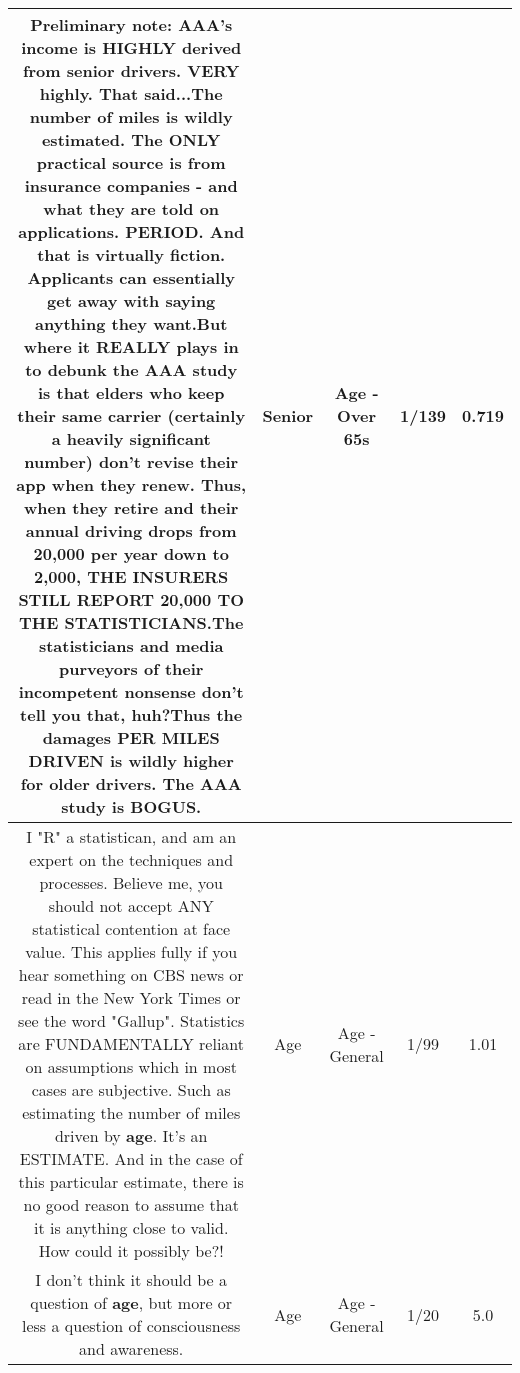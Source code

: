 \documentclass[11pt]{article}
\newlength\mylength
\begin{document}
\begin{center}
\begin{longtable}{|C{.65\mylength}|C{.30\mylength}|C{.12\mylength}|C{.12\mylength}|C{.12\mylength}|}
  \small Preliminary note: AAA's income is HIGHLY derived from \textbf{senior} drivers. VERY highly. That said...The number of miles is wildly estimated. The ONLY practical source is from insurance companies - and what they are told on applications. PERIOD.  And that is virtually fiction. Applicants can essentially get away with saying anything they want.But where it REALLY plays in to debunk the AAA study is that elders who keep their same carrier (certainly a heavily significant number) don't revise their app when they renew. Thus, when they retire and their annual driving drops from 20,000 per year down to 2,000, THE INSURERS STILL REPORT 20,000 TO THE STATISTICIANS.The statisticians and media purveyors of their incompetent nonsense don't tell you that, huh?Thus the damages PER MILES DRIVEN is wildly higher for older drivers. The AAA study is BOGUS.\normalsize   & Senior & Age - Over 65s & 1/139 & 0.719 \\  \hline
  \small I "R" a statistican, and am an expert on the techniques and processes. Believe me, you should not accept ANY statistical contention at face value. This applies fully if you hear something on CBS news or read in the New York Times or see the word "Gallup". Statistics are FUNDAMENTALLY reliant on assumptions which in most cases are subjective. Such as estimating the number of miles driven by \textbf{age}. It's an ESTIMATE. And in the case of this particular estimate, there is no good reason to assume that it is anything close to valid. How could it possibly be?!\normalsize   & Age & Age - General & 1/99 & 1.01 \\  \hline
  \small I don't think it should be a question of \textbf{age}, but more or less a question of consciousness and awareness.\normalsize   & Age & Age - General & 1/20 & 5.0 \\  \hline

\end{longtable}
\end{center}
\end{document}
